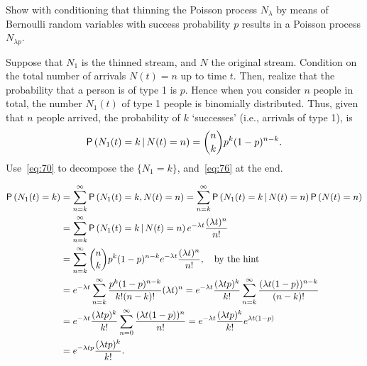 \begin{extra}
 Show with conditioning that thinning the Poisson process $N_\lambda$ by means of Bernoulli random variables with success probability $p$ results in a Poisson process $N_{\lambda p}$.
\begin{hint}
Suppose that $N_1$ is the thinned stream, and $N$ the original stream. Condition on the total number of arrivals $N(t)=n$ up to time
 $t$. Then, realize that the probability that a person is of type 1 is $p$. Hence when you consider $n$ people in
 total, the number $N_1(t)$ of type 1 people is binomially distributed. Thus, given that $n$ people arrived, the probability of $k$ `successes' (i.e., arrivals of type 1), is 
 \begin{equation*}
 \P{N_1(t)=k \given N(t) = n} = {n \choose k} p^k (1-p)^{n-k}.
 \end{equation*}
Use~\cref{eq:70} to decompose the $\{N_1=k\}$, and~\cref{eq:76} at the end. 
\end{hint}
\begin{solution}
\begin{align*}
 \P{N_1(t) = k}
&= \sum_{n=k}^\infty \P{N_1(t) =k, N(t) = n} 
= \sum_{n=k}^\infty \P{N_1(t) =k\given N(t) = n}\P{N(t)=n} \\
&= \sum_{n=k}^\infty \P{N_1(t) =k\given N(t) = n}e^{-\lambda t} \frac{(\lambda t)^n}{n!}\\
&= \sum_{n=k}^\infty {n \choose k} p^k (1-p)^{n-k} e^{-\lambda t} \frac{(\lambda t)^n}{n!}, \quad\text{by the hint}\\
&= e^{-\lambda t}\sum_{n=k}^\infty \frac{p^k (1-p)^{n-k}}{k! (n-k)!} (\lambda t)^n
= e^{-\lambda t} \frac{(\lambda t p)^k}{k!} \sum_{n=k}^\infty \frac{(\lambda t (1-p))^{n-k}}{(n-k)!}\\
&= e^{-\lambda t} \frac{(\lambda t p)^k}{k!} \sum_{n=0}^\infty \frac{(\lambda t (1-p))^{n}}{n!}
= e^{-\lambda t} \frac{(\lambda t p)^k}{k!} e^{\lambda t(1-p)} \\
&= e^{-\lambda t p} \frac{(\lambda t p)^k}{k!}.
\end{align*}
\end{solution}
\end{extra} 


